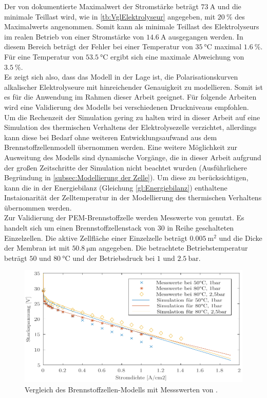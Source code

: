Der von \citet{hammoudi_new_2012} dokumentierte Maximalwert der Stromstärke beträgt $\SI{73}{\A}$ und die minimale Teillast wird, wie in \ref{tb:VglElektrolyseur} angegeben, mit $\SI{20}{\%}$ des Maximalwerts angenommen. Somit kann als minimale Teillast des Elektrolyseurs im realen Betrieb von einer Stromstärke von $\SI{14,6}{\A}$ ausgegangen werden. In diesem Bereich beträgt der Fehler bei einer Temperatur von $\SI{35}{\degreeCelsius}$ maximal $\SI{1,6}{\%}$. Für eine Temperatur von $\SI{53,5}{\degreeCelsius}$ ergibt sich eine maximale Abweichung von $\SI{3,5}{\%}$.\\
Es zeigt sich also, dass das Modell in der Lage ist, die Polarisationskurven alkalischer Elektrolyseure mit hinreichender Genauigkeit zu modellieren. Somit ist es für die Anwendung im Rahmen dieser Arbeit geeignet. Für folgende Arbeiten wird eine Validierung des Modells bei verschiedenen Druckniveaus empfohlen.\\

Um die Rechenzeit der Simulation gering zu halten wird in dieser Arbeit auf eine Simulation des thermischen Verhaltens der Elektrolysezelle verzichtet, allerdings kann diese bei Bedarf ohne weiteren Entwicklungsaufwand aus dem Brennstoffzellenmodell übernommen werden.
Eine weitere Möglichkeit zur Ausweitung des Modells sind dynamische Vorgänge, die in dieser Arbeit aufgrund der großen Zeitschritte der Simulation nicht beachtet wurden (Ausführlichere Begründung in \ref{subsec:Modellierung der Zelle}). Um diese zu berücksichtigen, kann die in der Energiebilanz (Gleichung \ref{gl:Energiebilanz}) enthaltene Instaionarität der Zelltemperatur in der Modellierung des thermischen Verhaltens übernommen werden.\\

Zur Validierung der PEM-Brennstoffzelle werden Messwerte von \citet{chugh_experimental_2020} genutzt. Es handelt sich um einen Brennstoffzellenstack von 30 in Reihe geschalteten Einzelzellen. Die aktive Zellfläche einer Einzelzelle beträgt $\SI{0,005}{\m\squared}$ und die Dicke der Membran ist mit $\SI{50,8}{\micro\m}$ angegeben. Die betrachtete Betriebstemperatur beträgt $50$ und $\SI{80}{\degreeCelsius}$ und der Betriebsdruck bei $1$ und $\SI{2,5}{\bar}$.

\begin{figure}[h]
	\centering
		\includegraphics[scale=1]{Figures/ValidierungPEMFC}
		\caption{Vergleich des Brennstoffzellen-Modells mit Messswerten von \citet{chugh_experimental_2020}.}
\label{fig:ValPEMFC}	
\end{figure}

